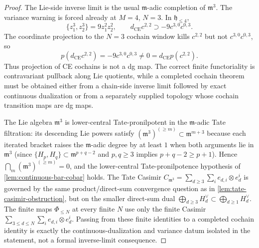 \begin{proof}
The Lie-side inverse limit is the usual \(\mathfrak m\)-adic completion
of \(\mathfrak m^3\).  The variance warning is forced already at
\(M=4\), \(N=3\).  In \(\mathfrak h_{\leq4}\),
\[
  \{z_1^3,z_2^3\}=9z_1^2z_2^2,
  \qquad
  d_{\mathrm{CE}}c^{2,2}\supset -9c^{3,0}c^{0,3}.
  \]
The coordinate projection to the \(N=3\) cochain window kills
\(c^{2,2}\) but not \(c^{3,0}c^{0,3}\), so
\[
  p(d_{\mathrm{CE}}c^{2,2})=-9c^{3,0}c^{0,3}
  \neq0=d_{\mathrm{CE}}p(c^{2,2}).
  \]
Thus projection of CE cochains is not a dg map.  The correct finite
functoriality is contravariant pullback along Lie quotients, while a
completed cochain theorem must be obtained either from a chain-side
inverse limit followed by exact continuous dualization or from a
separately supplied topology whose cochain transition maps are dg maps.

The Lie algebra $\mathfrak m^3$ is lower-central Tate-pronilpotent in the
$\mathfrak m$-adic Tate filtration: its descending Lie powers satisfy
$(\mathfrak m^3)^{(\geq m)}\subset\mathfrak m^{m+3}$ because each
iterated bracket raises the $\mathfrak m$-adic degree by at least
$1$ when both arguments lie in $\mathfrak m^3$ (since
$\{H_p,H_q\}\subset\mathfrak m^{p+q-2}$ and $p,q\geq 3$ implies
$p+q-2\geq p+1$). Hence $\bigcap_m(\mathfrak m^3)^{(\geq m)}=0$,
	and the lower-central Tate-pronilpotence hypothesis of
\ref{lem:continuous-bar-cobar} holds. The Tate Casimir
$C_{\mathfrak m^3}=\sum_{d\geq 3}\sum_i e_{d,i}\otimes e_d^i$
is governed by the same product/direct-sum convergence question
as in \ref{lem:tate-casimir-obstruction}, but on the smaller
	direct-sum dual $\bigoplus_{d\geq 3}H_d^\vee\subset
\bigoplus_{d\geq 1}H_d^\vee$.  The finite maps
\(\Phi_{\leq N}\) at every finite \(N\) use only the finite Casimir
\(\sum_{3\leq d\leq N}\sum_i e_{d,i}\otimes e_d^i\).  Passing from these
finite identities to a completed cochain identity is exactly the
continuous-dualization and variance datum isolated in the statement, not
a formal inverse-limit consequence.
\end{proof}

